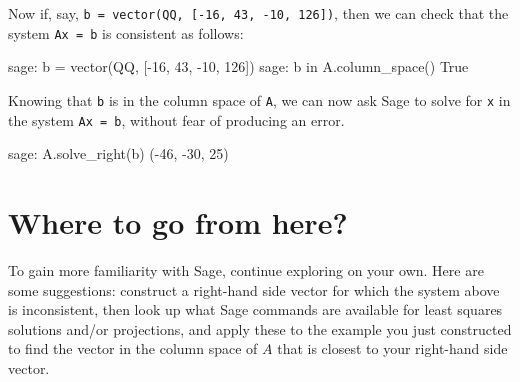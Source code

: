 \documentclass[fleqn,11pt]{paper}
\theoremstyle{remark}
\newcommand{\<}{\ensuremath{\langle}}
\renewcommand{\>}{\ensuremath{\rangle}}
\begin{document}
Now if, say, {\tt b = vector(QQ, [-16, 43, -10, 126])}, then we can check that
the system {\tt Ax = b} is consistent as follows:
\begin{sageblock}
    sage: b = vector(QQ, [-16, 43, -10, 126])
    sage: b in A.column_space()
      True
\end{sageblock}
Knowing that {\tt b} is in the column space of {\tt A}, we can now
ask Sage to solve for {\tt x} in the system {\tt Ax = b}, without fear of
producing an error.
\begin{sageblock}
    sage: A.solve_right(b)
      (-46, -30, 25)
\end{sageblock}

\section*{Where to go from here?}
\noindent To gain more familiarity with Sage, continue exploring on your own.  Here are
some suggestions: construct a right-hand side vector for which the system above is
inconsistent, then look up what Sage commands are available for least squares
solutions and/or projections, and apply these to the example you just constructed to find the
vector in the column space of $A$ that is closest to your right-hand side vector.
\end{document}
